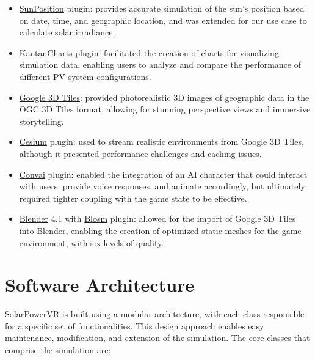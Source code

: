 \documentclass[draft, final]{vutinfth} %
\begin{document}
\begin{itemize}
\item \href{https://dev.epicgames.com/documentation/en-us/unreal-engine/geographically-accurate-sun-positioning-tool-in-unreal-engine?application_version=5.4}{SunPosition} plugin: provides accurate simulation of the sun's position based on date, time, and geographic location, and was extended for our use case to calculate solar irradiance.
\item \href{https://github.com/kamrann/KantanCharts}{KantanCharts} plugin: facilitated the creation of charts for visualizing simulation data, enabling users to analyze and compare the performance of different PV system configurations.
\item \href{https://developers.google.com/maps/documentation/tile/3d-tiles-overview}{Google 3D Tiles}: provided photorealistic 3D images of geographic data in the OGC 3D Tiles format, allowing for stunning perspective views and immersive storytelling.
\item \href{https://cesium.com/platform/cesium-for-unreal/}{Cesium} plugin: used to stream realistic environments from Google 3D Tiles, although it presented performance challenges and caching issues.
\item \href{https://www.unrealengine.com/marketplace/en-US/product/convai}{Convai} plugin: enabled the integration of an AI character that could interact with users, provide voice responses, and animate accordingly, but ultimately required tighter coupling with the game state to be effective.
\item \href{https://www.blender.org/}{Blender} 4.1 with \href{https://prochitecture.gumroad.com/l/blender-osm}{Blosm} plugin: allowed for the import of Google 3D Tiles into Blender, enabling the creation of optimized static meshes for the game environment, with six levels of quality.
\end{itemize}

\section{Software Architecture}

SolarPowerVR is built using a modular architecture, with each class responsible for a specific set of functionalities. This design approach enables easy maintenance, modification, and extension of the simulation. The core classes that comprise the simulation are:
\end{document}
